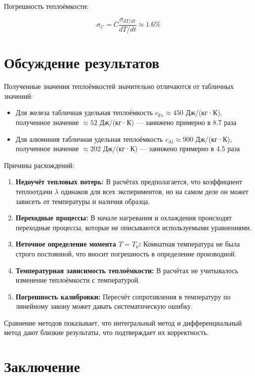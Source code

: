 \documentclass{article}
\begin{document}
Погрешность теплоёмкости:

\begin{equation}
\sigma_C = C \frac{\sigma_{dT/dt}}{dT/dt} \approx 1.6\%
\end{equation}

\section*{Обсуждение результатов}

Полученные значения теплоёмкостей значительно отличаются от табличных значений:
\begin{itemize}
\item Для железа табличная удельная теплоёмкость $c_{\text{Fe}} \approx 450$ Дж/(кг·К), полученное значение $\approx 52$ Дж/(кг·К) — занижено примерно в 8.7 раза
\item Для алюминия табличная удельная теплоёмкость $c_{\text{Al}} \approx 900$ Дж/(кг·К), полученное значение $\approx 202$ Дж/(кг·К) — занижено примерно в 4.5 раза
\end{itemize}

Причины расхождений:
\begin{enumerate}
\item \textbf{Недоучёт тепловых потерь:} В расчётах предполагается, что коэффициент теплоотдачи $\lambda$ одинаков для всех экспериментов, но на самом деле он может зависеть от температуры и наличия образца.
\item \textbf{Переходные процессы:} В начале нагревания и охлаждения происходят переходные процессы, которые не описываются используемыми уравнениями.
\item \textbf{Неточное определение момента $T = T_k$:} Комнатная температура не была строго постоянной, что вносит погрешность в определение производной.
\item \textbf{Температурная зависимость теплоёмкости:} В расчётах не учитывалось изменение теплоёмкости с температурой.
\item \textbf{Погрешность калибровки:} Пересчёт сопротивления в температуру по линейному закону может давать систематическую ошибку.
\end{enumerate}

Сравнение методов показывает, что интегральный метод и дифференциальный метод дают близкие результаты, что подтверждает их корректность.

\section*{Заключение}
\end{document}
